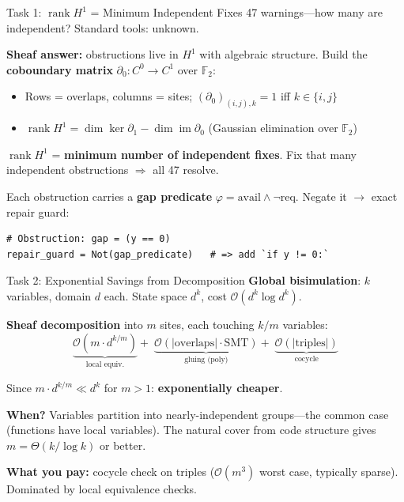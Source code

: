 \documentclass[aspectratio=169,10pt]{beamer}
\begin{document}
\begin{frame}[fragile]{Task 1: $\operatorname{rank} H^1$ = Minimum Independent Fixes}
47 warnings---how many are independent? Standard tools: unknown.

\vspace{0.2em}
\textbf{Sheaf answer:} obstructions live in $H^1$ with algebraic structure.
Build the \textbf{coboundary matrix} $\partial_0\!: C^0 \!\to\! C^1$ over $\mathbb{F}_2$:
\begin{itemize}\small
  \item Rows = overlaps, columns = sites;\;
        $(\partial_0)_{(i,j),k} = 1$ iff $k \in \{i,j\}$
  \item $\operatorname{rank} H^1 = \dim\ker\partial_1 - \dim\operatorname{im}\partial_0$
        \quad(Gaussian elimination over $\mathbb{F}_2$)
\end{itemize}

\vspace{0.1em}
$\operatorname{rank} H^1$ = \textbf{minimum number of independent fixes}.
Fix that many independent obstructions $\Rightarrow$ all 47 resolve.

\vspace{0.2em}
Each obstruction carries a \textbf{gap predicate}
$\varphi = \text{avail} \land \lnot\text{req}$.
Negate it $\to$ exact repair guard:

\begin{lstlisting}
# Obstruction: gap = (y == 0)
repair_guard = Not(gap_predicate)   # => add `if y != 0:`
\end{lstlisting}
\end{frame}

\begin{frame}{Task 2: Exponential Savings from Decomposition}
\textbf{Global bisimulation}: $k$ variables, domain $d$ each.
State space $d^k$, cost $\mathcal{O}(d^k \log d^k)$.

\vspace{0.4em}
\textbf{Sheaf decomposition} into $m$ sites, each touching $k/m$ variables:
\[
\underbrace{\mathcal{O}(m \cdot d^{k/m})}_{\text{local equiv.}}
+\;
\underbrace{\mathcal{O}(|\text{overlaps}| \cdot \text{SMT})}_{\text{gluing (poly)}}
+\;
\underbrace{\mathcal{O}(|\text{triples}|)}_{\text{cocycle}}
\]

Since $m \cdot d^{k/m} \ll d^k$ for $m > 1$:
\textbf{exponentially cheaper}.

\vspace{0.4em}
\textbf{When?} Variables partition into nearly-independent groups---the
common case (functions have local variables). The natural cover from code
structure gives $m = \Theta(k/\log k)$ or better.

\vspace{0.4em}
\textbf{What you pay:} cocycle check on triples ($\mathcal{O}(m^3)$ worst case,
typically sparse). Dominated by local equivalence checks.
\end{frame}
\end{document}
